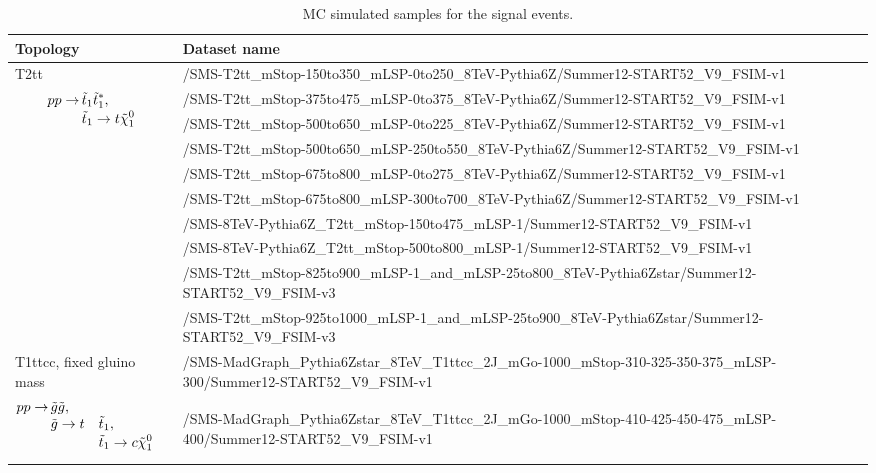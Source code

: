 \begin{sidewaystable}
\fontsize{6 pt}{1 em}
\selectfont
\caption{MC simulated samples for the signal events.}
\begin{center}
\begin{tabular}{l l}
\toprule
Topology & Dataset name \\
\midrule
\multirow{10}{3.5cm}{T2tt \begin{align*}
pp \rightarrow\, &\tilde{t}_1 \tilde{t}_1^*, \\[-3pt]
               &\tilde{t}_1 \rightarrow t \tilde{\chi}_1^0 \\[-3pt]
               \end{align*}} &
/SMS-T2tt\_mStop-150to350\_mLSP-0to250\_8TeV-Pythia6Z/Summer12-START52\_V9\_FSIM-v1 \\
& /SMS-T2tt\_mStop-375to475\_mLSP-0to375\_8TeV-Pythia6Z/Summer12-START52\_V9\_FSIM-v1 \\
& /SMS-T2tt\_mStop-500to650\_mLSP-0to225\_8TeV-Pythia6Z/Summer12-START52\_V9\_FSIM-v1 \\
& /SMS-T2tt\_mStop-500to650\_mLSP-250to550\_8TeV-Pythia6Z/Summer12-START52\_V9\_FSIM-v1 \\
& /SMS-T2tt\_mStop-675to800\_mLSP-0to275\_8TeV-Pythia6Z/Summer12-START52\_V9\_FSIM-v1 \\
& /SMS-T2tt\_mStop-675to800\_mLSP-300to700\_8TeV-Pythia6Z/Summer12-START52\_V9\_FSIM-v1 \\
& /SMS-8TeV-Pythia6Z\_T2tt\_mStop-150to475\_mLSP-1/Summer12-START52\_V9\_FSIM-v1 \\
& /SMS-8TeV-Pythia6Z\_T2tt\_mStop-500to800\_mLSP-1/Summer12-START52\_V9\_FSIM-v1 \\
& /SMS-T2tt\_mStop-825to900\_mLSP-1\_and\_mLSP-25to800\_8TeV-Pythia6Zstar/Summer12-START52\_V9\_FSIM-v3 \\
& /SMS-T2tt\_mStop-925to1000\_mLSP-1\_and\_mLSP-25to900\_8TeV-Pythia6Zstar/Summer12-START52\_V9\_FSIM-v3 \\
\midrule
\multirow{6}{3.5cm}{T1ttcc, fixed gluino mass 
\begin{alignat*}{3}
pp \rightarrow\, &\tilde{g} \tilde{g}, \\[-3pt]
               &\tilde{g} \rightarrow t &&\tilde{t}_1, \\[-3pt]
               & &&\tilde{t}_1 \rightarrow c \tilde{\chi}_1^0
\end{alignat*}}
&/SMS-MadGraph\_Pythia6Zstar\_8TeV\_T1ttcc\_2J\_mGo-1000\_mStop-310-325-350-375\_mLSP-300/Summer12-START52\_V9\_FSIM-v1 \\
&/SMS-MadGraph\_Pythia6Zstar\_8TeV\_T1ttcc\_2J\_mGo-1000\_mStop-410-425-450-475\_mLSP-400/Summer12-START52\_V9\_FSIM-v1 \\

\end{tabular}
\end{center}
\end{sidewaystable}
